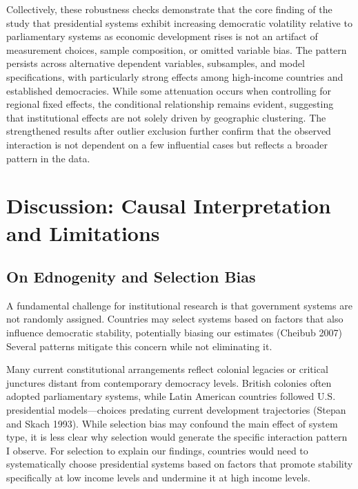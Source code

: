 \documentclass[
  letterpaper,
  DIV=11,
  numbers=noendperiod]{scrartcl}
\begin{document}
Collectively, these robustness checks demonstrate that the core finding
of the study that presidential systems exhibit increasing democratic
volatility relative to parliamentary systems as economic development
rises is not an artifact of measurement choices, sample composition, or
omitted variable bias. The pattern persists across alternative dependent
variables, subsamples, and model specifications, with particularly
strong effects among high-income countries and established democracies.
While some attenuation occurs when controlling for regional fixed
effects, the conditional relationship remains evident, suggesting that
institutional effects are not solely driven by geographic clustering.
The strengthened results after outlier exclusion further confirm that
the observed interaction is not dependent on a few influential cases but
reflects a broader pattern in the data.

\section{Discussion: Causal Interpretation and
Limitations}\label{sec-discussion}

\subsection{On Ednogenity and Selection
Bias}\label{on-ednogenity-and-selection-bias}

A fundamental challenge for institutional research is that government
systems are not randomly assigned. Countries may select systems based on
factors that also influence democratic stability, potentially biasing
our estimates (Cheibub 2007) Several patterns mitigate this concern
while not eliminating it.

Many current constitutional arrangements reflect colonial legacies or
critical junctures distant from contemporary democracy levels. British
colonies often adopted parliamentary systems, while Latin American
countries followed U.S. presidential models---choices predating current
development trajectories (Stepan and Skach 1993). While selection bias
may confound the main effect of system type, it is less clear why
selection would generate the specific interaction pattern I observe. For
selection to explain our findings, countries would need to
systematically choose presidential systems based on factors that promote
stability specifically at low income levels and undermine it at high
income levels.
\end{document}
